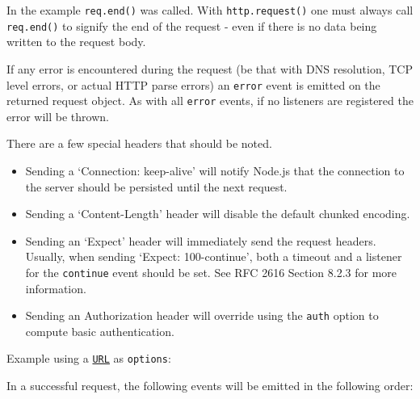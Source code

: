 In the example \texttt{req.end()} was called. With
\texttt{http.request()} one must always call \texttt{req.end()} to
signify the end of the request - even if there is no data being written
to the request body.

If any error is encountered during the request (be that with DNS
resolution, TCP level errors, or actual HTTP parse errors) an
\texttt{\textquotesingle{}error\textquotesingle{}} event is emitted on
the returned request object. As with all
\texttt{\textquotesingle{}error\textquotesingle{}} events, if no
listeners are registered the error will be thrown.

There are a few special headers that should be noted.

\begin{itemize}
\item
  Sending a `Connection: keep-alive' will notify Node.js that the
  connection to the server should be persisted until the next request.
\item
  Sending a `Content-Length' header will disable the default chunked
  encoding.
\item
  Sending an `Expect' header will immediately send the request headers.
  Usually, when sending `Expect: 100-continue', both a timeout and a
  listener for the \texttt{\textquotesingle{}continue\textquotesingle{}}
  event should be set. See RFC 2616 Section 8.2.3 for more information.
\item
  Sending an Authorization header will override using the \texttt{auth}
  option to compute basic authentication.
\end{itemize}

Example using a \href{url.md\#the-whatwg-url-api}{\texttt{URL}} as
\texttt{options}:

\begin{Shaded}
\begin{Highlighting}[]
\OperatorTok{=}  \NormalTok{(}\NormalTok{)}\OperatorTok{;}

\OperatorTok{=}\OperatorTok{,}\KeywordTok{=\textgreater{}}\NormalTok{ \{}
\NormalTok{\})}\OperatorTok{;}
\end{Highlighting}
\end{Shaded}

In a successful request, the following events will be emitted in the
following order:


